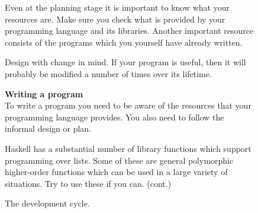 \begin{figure}
\itemstart
Even at the planning stage it is important to know what your resources
are. Make sure you check what is provided by your programming language
and its libraries.
Another important resource consists of the programs which you yourself
have already written.

\itemstart
Design with change in mind. If your program is useful, then it will
probably be modified a number of times over its lifetime.


\bigskip
\noindent
{\sc \textbf{Writing a program}}\hspace*{1mm}\hrulefill\\

\noindent
To write a program you need to be aware of the resources that your
programming language provides. You also need to follow the informal
design or plan.

\itemstart
Haskell has a substantial number of library functions which support
programming over lists. Some of these are general polymorphic higher-order functions
which can be used in a large variety of situations. Try to use these if you can.
\hfill(cont.)\\
\caption{The development cycle.}
\label{devCycle1}
\end{figure}


